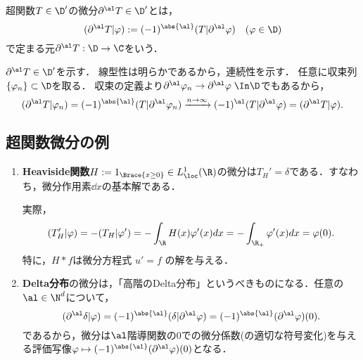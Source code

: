 \documentclass[uplatex,dvipdfmx]{jsreport}
\begin{document}
\begin{definition}
    超関数$T\in\D'$の微分$\partial^\al T\in\D'$とは，
    \[(\partial^\al T|\varphi):=(-1)^{\abs{\al}}(T|\partial^\al\varphi)\quad(\varphi\in\D)\]
    で定まる元$\partial^\al T:\D\to\C$をいう．
\end{definition}
\begin{Proof}
    $\partial^\al T\in\D'$を示す．
    線型性は明らかであるから，連続性を示す．
    任意に収束列$\{\varphi_n\}\subset\D$を取る．
    収束の定義より$\partial^\al\varphi_n\to\partial^\al\varphi\;\In\D$でもあるから，
    \[(\partial^\al T|\varphi_n)=(-1)^{\abs{\al}}(T|\partial^\al\varphi_n)\xrightarrow{n\to\infty}(-1)^{\al}(T|\partial^\al\varphi)=(\partial^\al T|\varphi).\]
\end{Proof}

\subsection{超関数微分の例}

\begin{example}\mbox{}
    \begin{enumerate}
        \item \textbf{Heaviside関数}$H:=1_{\Brace{x\ge0}}\in L^1_\loc(\R)$の微分は$T_H'=\delta$である．すなわち，微分作用素$\dd{}{x}$の基本解である．
        
        実際，
        \[(T_H'|\varphi)=-(T_H|\varphi')=-\int_\R H(x)\varphi'(x)dx=-\int_{\R_+}\varphi'(x)dx=\varphi(0).\]
        特に，$H*f$は微分方程式
        $u'=f$
        の解を与える．
        \item \textbf{Delta分布}の微分は，「高階のDelta分布」というべきものになる．任意の$\al\in\N^d$について，
        \[(\partial^\al\delta|\varphi)=(-1)^{\abs{\al}}(\delta|\partial^\al\varphi)=(-1)^{\abs{\al}}(\partial^\al\varphi)(0).\]
        であるから，微分は$\al$階導関数の$0$での微分係数(の適切な符号変化)を与える評価写像$\varphi\mapsto(-1)^{\abs{\al}}(\partial^\al\varphi)(0)$となる．
    \end{enumerate}
\end{example}
\end{document}
